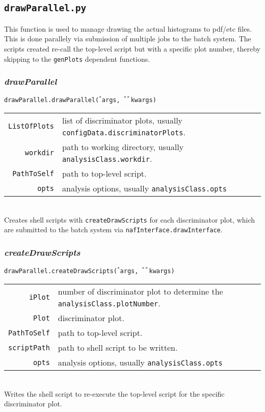 \documentclass[12pt, a4paper]{article}
\newcommand{\args}{$^*$args}
\newcommand{\kwargs}{$^{**}$kwargs}
\begin{document}
\subsection{\texttt{drawParallel.py}}
This function is used to manage drawing the actual histograms to pdf/etc files. This is done parallely via submission of multiple jobs to the batch system. The scripts created re-call the top-level script but with a specific plot number, thereby skipping to the \texttt{genPlots} dependent functions.

\subsubsection{\textit{drawParallel}}
\texttt{drawParallel.drawParallel(\args, \kwargs)}\\
\begin{tabular}{r|l}
\hline
\texttt{ListOfPlots}	&	list of discriminator plots, usually \texttt{configData.discriminatorPlots}.\\
\texttt{workdir}		&	path to working directory, usually \texttt{analysisClass.workdir}.\\
\texttt{PathToSelf}		&	path to top-level script.\\
\texttt{opts}			&	analysis options, usually \texttt{analysisClass.opts}\\
\hline
\end{tabular}
\\
Creates shell scripts with \texttt{createDrawScripts} for each discriminator plot, which are submitted to the batch system via \texttt{nafInterface.drawInterface}.


\subsubsection{\textit{createDrawScripts}}
\texttt{drawParallel.createDrawScripts(\args, \kwargs)}\\
\begin{tabular}{r|l}
\hline
\texttt{iPlot}		&	number of discriminator plot to determine the \texttt{analysisClass.plotNumber}.\\
\texttt{Plot}		&	discriminator plot.\\
\texttt{PathToSelf}	&	path to top-level script.\\
\texttt{scriptPath}	&	path to shell script to be written.\\
\texttt{opts}		&	analysis options, usually \texttt{analysisClass.opts}\\
\hline
\end{tabular}
\\
Writes the shell script to re-execute the top-level script for the specific discriminator plot.
\end{document}
